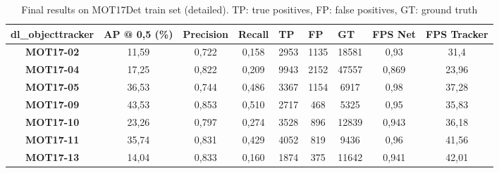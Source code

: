 \begin{table}[H]
\scriptsize 

\begin{tabular}{|c|c|c|c|c|c|c|c|c|}
\hline
\textbf{dl\_objecttracker} & \textbf{AP @ 0,5 (\%)} & \multicolumn{1}{l|}{\textbf{Precision}} & \multicolumn{1}{l|}{\textbf{Recall}} & \multicolumn{1}{l|}{\textbf{TP}} & \multicolumn{1}{l|}{\textbf{FP}} & \multicolumn{1}{l|}{\textbf{GT}} & \textbf{FPS Net} & \multicolumn{1}{l|}{\textbf{FPS Tracker}} \\ \hline
\textbf{MOT17-02}          & 11,59                  & 0,722                                   & 0,158                                & 2953                             & 1135                             & 18581                            & 0,93             & 31,4                                      \\ \hline
\textbf{MOT17-04}          & 17,25                  & 0,822                                   & 0,209                                & 9943                             & 2152                             & 47557                            & 0,869            & 23,96                                     \\ \hline
\textbf{MOT17-05}          & 36,53                  & 0,744                                   & 0,486                                & 3367                             & 1154                             & 6917                             & 0,98             & 37,28                                     \\ \hline
\textbf{MOT17-09}          & 43,53                  & 0,853                                   & 0,510                                & 2717                             & 468                              & 5325                             & 0,95             & 35,83                                     \\ \hline
\textbf{MOT17-10}          & 23,26                  & 0,797                                   & 0,274                                & 3528                             & 896                              & 12839                            & 0,943            & 36,18                                     \\ \hline
\textbf{MOT17-11}          & 35,74                  & 0,831                                   & 0,429                                & 4052                             & 819                              & 9436                             & 0,96             & 41,56                                     \\ \hline
\textbf{MOT17-13}          & 14,04                  & 0,833                                   & 0,160                                & 1874                             & 375                              & 11642                            & 0,941            & 42,01                                     \\ \hline
\end{tabular}

\caption{Final results on MOT17Det train set (detailed). TP: true positives, FP: false positives, GT: ground truth}
\label{tab:annex_2}
\end{table}
